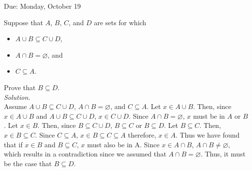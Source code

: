 \documentclass[10pt]{exam}
\begin{document}
\newcommand{\dd}{\textrm{d}}
\newcommand{\NN}{\mathbb N}
\newcommand{\CC}{\mathbb C}
\newcommand{\QQ}{\mathbb Q}
\newcommand{\ZZ}{\mathbb Z}
\newcommand{\RR}{\mathbb R}
\newcommand{\proofdone}{\hfill $\square$}

\noindent Due:  Monday, October 19  \\
\vskip 0.5cm
\begin{questions}
\question 
{}

\newpage

\question Suppose that $A$, $B$, $C$, and $D$ are sets for which
\begin{itemize} 
\item $A\cup B \subseteq C\cup D$, 
\item $A\cap B = \varnothing$, and 
\item $C\subseteq A$.  
\end{itemize}
Prove that $B\subseteq D$.\\
\emph{Solution.}\\
Assume $A\cup B \subseteq C\cup D$, $A\cap B = \varnothing$, and $C\subseteq A$. Let $x \in A\cup B$. 
Then, since $x \in A\cup B$ and $A\cup B \subseteq C\cup D$, $x \in C\cup D$. Since $A\cap B = \varnothing$, 
$x$ must be in $A$ or $B$. Let $x \in B$. Then, since $B \subseteq C\cup D$, $B\subseteq C$ or $B\subseteq D$. 
Let $B \subseteq C$. Then, $x \in B \subseteq C$. Since $C \subseteq A$, $x \in B \subseteq C \subseteq A$
therefore, $x \in A$. Thus we have found that if $x\in B$ and $B \subseteq C$, $x$ must also be in A. 
Since $x \in A\cap B$, $A\cap B \neq \varnothing$, which results in a contradiction since we assumed
that $A\cap B = \varnothing$. Thus, it must be the case that $B \subseteq D$. 


\end{questions}
\end{document}
